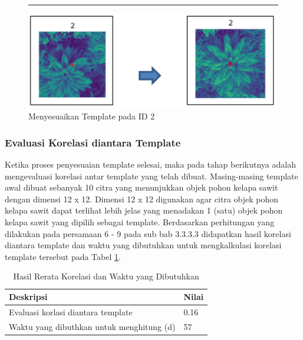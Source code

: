 \begin{figure}[H]
	\vspace{-0.1cm}
	\rule{\columnwidth}{0.1pt}
	\begin{center}
		\includegraphics[width=1\columnwidth]{bab4/Gambar/Picture14.png}
	\end{center}
	\vspace{-0.2cm}
	\captionsetup{justification=centering}
	\caption{Menyesuaikan Template pada ID 2}\label{img:Menyesuaikan-Template-Pada-ID-2}
\end{figure}

\subsubsection{Evaluasi Korelasi diantara Template}
\hspace{1,2cm}
Ketika proses penyesuaian template selesai, maka pada tahap berikutnya adalah mengevaluasi korelasi antar template yang telah dibuat. Masing-masing template awal dibuat sebanyak 10 citra yang menunjukkan objek pohon kelapa sawit dengan dimensi 12 x 12. Dimensi 12 x 12 digunakan agar citra objek pohon kelapa sawit dapat terlihat lebih jelas yang menadakan 1 (satu) objek pohon kelapa sawit yang dipilih sebagai template. Berdasarkan perhitungan yang dilakukan pada persamaan 6 - 9 pada sub bab 3.3.3.3 didapatkan hasil korelasi diantara template dan waktu yang dibutuhkan untuk mengkalkulasi korelasi template tersebut pada Tabel \ref{tbl:Hasil-Rerata-Korelasi-dan-Waktu-Yang-Dibutuhkan}.

\begin{singlespace}
	\begin{table}[H]
		\centering
		\caption{Hasil Rerata Korelasi dan Waktu yang Dibutuhkan}
		\label{tbl:Hasil-Rerata-Korelasi-dan-Waktu-Yang-Dibutuhkan}
		\begin{tabular}{|p{8cm}|p{4cm}|}
			\hline
			\rowcolor[HTML]{D9D9D9} 
			Deskripsi                                 & Nilai \\ \hline
			Evaluasi korlasi diantara template        & 0.16  \\ \hline
			Waktu yang dibuthkan untuk menghitung (d) & 57    \\ \hline
		\end{tabular}
	\end{table}
\end{singlespace}

